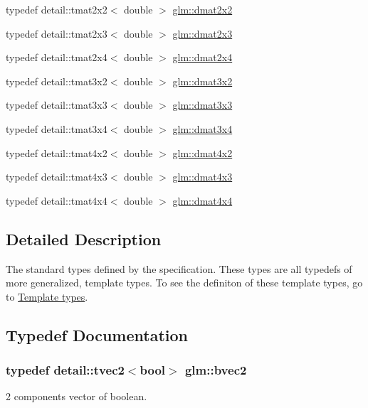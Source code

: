 \begin{DoxyCompactItemize}
\item 
typedef detail\-::tmat2x2$<$ double $>$ \hyperlink{group__core__types_ga2c1de969d1d8cfcb297dbfa476b33dc8}{glm\-::dmat2x2}
\item 
typedef detail\-::tmat2x3$<$ double $>$ \hyperlink{group__core__types_gadba2f0efb492f511466de9784b0e07cd}{glm\-::dmat2x3}
\item 
typedef detail\-::tmat2x4$<$ double $>$ \hyperlink{group__core__types_gaa97c63383e2dc472510d77409a7d5001}{glm\-::dmat2x4}
\item 
typedef detail\-::tmat3x2$<$ double $>$ \hyperlink{group__core__types_ga44d603bc9ed3688928f508fb161c71f0}{glm\-::dmat3x2}
\item 
typedef detail\-::tmat3x3$<$ double $>$ \hyperlink{group__core__types_ga415251df22cffb39bc14078ff057a6c3}{glm\-::dmat3x3}
\item 
typedef detail\-::tmat3x4$<$ double $>$ \hyperlink{group__core__types_ga9ec18b898499ad524dc93f2d4d78b877}{glm\-::dmat3x4}
\item 
typedef detail\-::tmat4x2$<$ double $>$ \hyperlink{group__core__types_gaec598e6dda8b2119877d992f5e0c1bae}{glm\-::dmat4x2}
\item 
typedef detail\-::tmat4x3$<$ double $>$ \hyperlink{group__core__types_ga47f7b642f84d1272a0dafa221c8fd720}{glm\-::dmat4x3}
\item 
typedef detail\-::tmat4x4$<$ double $>$ \hyperlink{group__core__types_gaa505ead5e0b6d8bc504ccfeadbac83d5}{glm\-::dmat4x4}
\end{DoxyCompactItemize}


\subsection{\-Detailed \-Description}
\-The standard types defined by the specification. \-These types are all typedefs of more generalized, template types. \-To see the definiton of these template types, go to \hyperlink{group__core__template}{\-Template types}. 

\subsection{\-Typedef \-Documentation}
\hypertarget{group__core__types_ga0b5729ae4f7b2767a18bb96b7152c072}{
\subsubsection[{bvec2}]{\setlength{\rightskip}{0pt plus 5cm}typedef detail\-::tvec2$<$bool$>$ {\bf glm\-::bvec2}}}\label{group__core__types_ga0b5729ae4f7b2767a18bb96b7152c072}
2 components vector of boolean.

